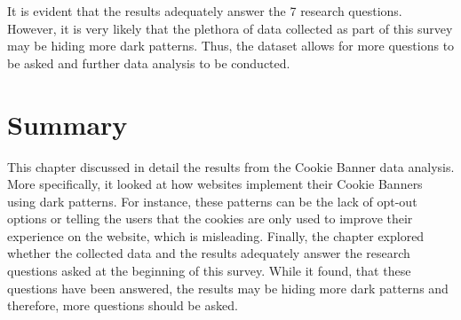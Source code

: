 \documentclass[../main.tex]{subfiles}
\begin{document}
It is evident that the results adequately answer the 7 research questions. However, it is very likely that the plethora of data collected as part of this survey may be hiding more dark patterns. Thus, the dataset allows for more questions to be asked and further data analysis to be conducted. 

\section{Summary}
This chapter discussed in detail the results from the Cookie Banner data analysis. More specifically, it looked at how websites implement their Cookie Banners using dark patterns. For instance, these patterns can be the lack of opt-out options or telling the users that the cookies are only used to improve their experience on the website, which is misleading. Finally, the chapter explored whether the collected data and the results adequately answer the research questions asked at the beginning of this survey. While it found, that these questions have been answered, the results may be hiding more dark patterns and therefore, more questions should be asked.
\end{document}

